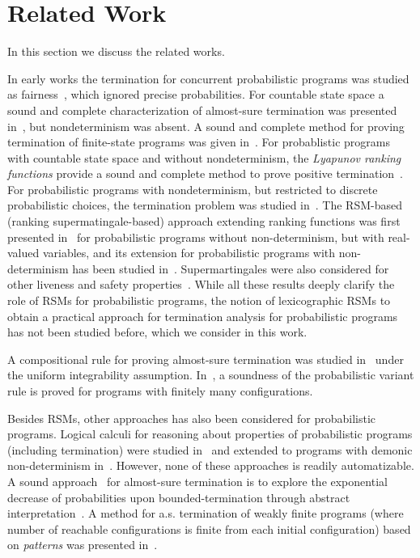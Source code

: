 
\section{Related Work}
In this section we discuss the related works.

\smallskip{}
In early works the termination for concurrent probabilistic programs was studied 
as fairness~\cite{SPH84}, which ignored precise probabilities.
For countable state space a sound and complete characterization of almost-sure termination 
was presented in~\cite{HS85}, but nondeterminism was absent.
A sound and complete method for proving termination of finite-state programs
was given in~\cite{EGK12}.
For probablistic programs with countable state space and without 
nondeterminism, the {\em Lyapunov ranking functions} provide a sound and 
complete method to prove positive termination~\cite{BG05,Foster53}.
For probabilistic programs with nondeterminism, but restricted to discrete probabilistic
choices, the termination problem was studied 
in~\cite{MM04,MM05}.
The RSM-based (ranking supermatingale-based) approach extending ranking functions was first 
presented in~\cite{SriramCAV} for probabilistic programs without non-determinism,
but with real-valued variables, and its extension for probabilistic programs
with non-determinism has been studied 
in~\cite{HolgerPOPL,CF17,CFNH16:prob-termination,CFG16,CNZ17,MM16:proofrule-arxiv}. 
Supermartingales were also 
considered for other liveness and safety 
properties~\cite{CVS16:martingale-recurrence-persistence,BEFH16:doob}.
While all these results deeply clarify the role of RSMs for probabilistic programs, 
the notion of lexicographic RSMs to obtain a practical approach for termination 
analysis for probabilistic programs has not been studied before, which we consider in 
this work.

\smallskip{} 
A 
compositional rule for proving almost-sure termination was studied 
in~\cite{HolgerPOPL} under the uniform integrability assumption. 
In~\cite{MM05}, a soundness of the probabilistic variant rule is proved for 
programs with finitely many configurations.


\smallskip{}
Besides RSMs, other approaches has also been considered for probabilistic programs.
Logical calculi for reasoning about properties of 
probabilistic programs (including termination) were studied 
in~\cite{Kozen:prob-semantics,FH:prdl,Kozen:probabilistic-PDL,Feldman:propositional-probdl}
 and extended to programs with demonic non-determinism 
 in~\cite{MM04,MM05,KKMO16:wp-expected-runtime,OKKM16:recursive-prob-wp-calculus,GKI14:prob-semantics,
  DBLP:conf/sas/KatoenMMM10}. However, none of these approaches is readily 
  automatizable.
A sound approach~\cite{DBLP:conf/sas/Monniaux01} for almost-sure termination 
is to explore the exponential decrease of probabilities upon 
bounded-termination 
through abstract interpretation~\cite{DBLP:conf/popl/CousotC77}. A method for 
a.s. termination of weakly finite programs (where number of reachable 
configurations is finite from each initial configuration) based on 
\emph{patterns} was presented in~\cite{EGK12}.
 

